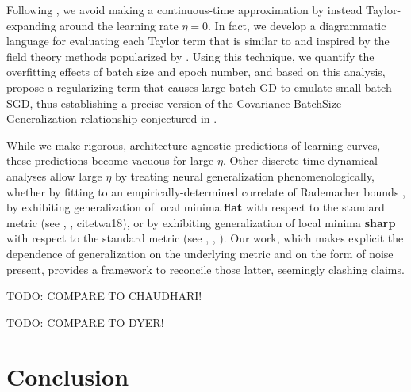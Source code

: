 \documentclass{article}
\newcommand{\sdia}[1]{\begin{gathered}\texttt{[image: ../diagrams/\#1.png]}\end{gathered}}
\begin{document}
    Following \citet{ro18}, we avoid making a continuous-time approximation by
    instead Taylor-expanding around the learning rate $\eta=0$.  In fact, we
    develop a diagrammatic language for evaluating each Taylor term that is
    similar to and inspired by the field theory methods popularized by
    \citet{dy49a}.  Using this technique, we quantify the overfitting effects
    of batch size and epoch number, and based on this analysis, propose a
    regularizing term that causes large-batch GD to emulate small-batch SGD,
    thus establishing a precise version of the
    Covariance-BatchSize-Generalization relationship conjectured in
    \citet{ja18}.  
    
    While we make rigorous, architecture-agnostic predictions of learning
    curves, these predictions become vacuous for large $\eta$.  Other
    discrete-time dynamical analyses allow large $\eta$ by treating neural
    generalization phenomenologically, whether by fitting to an
    empirically-determined correlate of Rademacher bounds \citep{li18}, by
    exhibiting generalization of local minima {\bf flat} with respect to the
    standard metric (see \citet{ho17}, \citet{ke17}, citet{wa18}), or by
    exhibiting generalization of local minima {\bf sharp} with respect to the
    standard metric (see \citet{st56}, \citet{di17}, \citet{wu18}).  Our work,
    which makes explicit the dependence of generalization on the underlying
    metric and on the form of noise present, provides a framework to reconcile
    those latter, seemingly clashing claims.
    
    {\color{red} TODO: COMPARE TO CHAUDHARI!}
    
    {\color{red} TODO: COMPARE TO DYER!}


\section{Conclusion}

    
\end{document}
